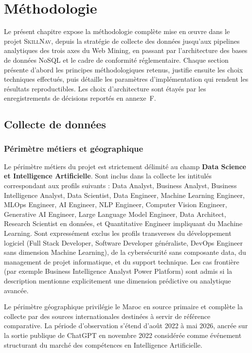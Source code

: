 \documentclass[11pt,a4paper,openany]{report}
\newcommand{\skillnav}{\textsc{SkillNav}\xspace}
\begin{document}
\chapter{M\'ethodologie}

Le pr\'esent chapitre expose la m\'ethodologie compl\`ete mise en \oe uvre dans le projet \skillnav, depuis la strat\'egie de collecte des donn\'ees jusqu'aux pipelines analytiques des trois axes du Web Mining, en passant par l'architecture des bases de donn\'ees NoSQL et le cadre de conformit\'e r\'eglementaire. Chaque section pr\'esente d'abord les principes m\'ethodologiques retenus, justifie ensuite les choix techniques effectu\'es, puis d\'etaille les param\`etres d'impl\'ementation qui rendent les r\'esultats reproductibles. Les choix d'architecture sont \'etay\'es par les enregistrements de d\'ecisions report\'es en annexe~F.

\section{Collecte de donn\'ees}

\subsection{P\'erim\`etre m\'etiers et g\'eographique}

Le p\'erim\`etre m\'etiers du projet est strictement d\'elimit\'e au champ \textbf{Data Science et Intelligence Artificielle}. Sont inclus dans la collecte les intitul\'es correspondant aux profils suivants : Data Analyst, Business Analyst, Business Intelligence Analyst, Data Scientist, Data Engineer, Machine Learning Engineer, MLOps Engineer, AI Engineer, NLP Engineer, Computer Vision Engineer, Generative AI Engineer, Large Language Model Engineer, Data Architect, Research Scientist en donn\'ees, et Quantitative Engineer impliquant du Machine Learning. Sont express\'ement exclus les profils transverses du d\'eveloppement logiciel (Full Stack Developer, Software Developer g\'en\'eraliste, DevOps Engineer sans dimension Machine Learning), de la cybers\'ecurit\'e sans composante data, du management de projet informatique, et du support technique. Les cas fronti\`ere (par exemple Business Intelligence Analyst Power Platform) sont admis si la description mentionne explicitement une dimension pr\'edictive ou analytique avanc\'ee.

Le p\'erim\`etre g\'eographique privil\'egie le Maroc en source primaire et compl\`ete la collecte par des sources internationales destin\'ees \`a servir de r\'ef\'erence comparative. La p\'eriode d'observation s'\'etend d'ao\^ut 2022 \`a mai 2026, ancr\'ee sur la sortie publique de ChatGPT en novembre 2022 consid\'er\'ee comme \'ev\'enement structurant du march\'e des comp\'etences en Intelligence Artificielle.
\end{document}
